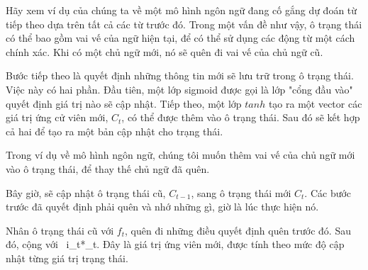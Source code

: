Hãy xem ví dụ của chúng ta về một mô hình ngôn ngữ đang cố gắng dự đoán từ tiếp theo dựa trên tất cả các từ trước đó.
Trong một vấn đề như vậy, ô trạng thái có thể bao gồm vai vế của ngữ hiện tại, để có thể sử dụng các động từ
một cách chính xác. Khi có một chủ ngữ mới, nó sẽ quên đi vai vế của chủ ngữ cũ.

\begin{figure}[!htb]
\end{figure}

Bước tiếp theo là quyết định những thông tin mới sẽ lưu trữ trong ô trạng thái. Việc này có hai phần. Đầu tiên,
một lớp sigmoid được gọi là lớp "cổng đầu vào" quyết định giá trị nào sẽ cập nhật. Tiếp theo, một lớp \(tanh\)
tạo ra một vector các giá trị ứng cử viên mới, \(C_t\), có thể được thêm vào ô trạng thái. Sau đó sẽ kết hợp  cả hai
để tạo ra một bản cập nhật cho trạng thái.

Trong ví dụ về mô hình ngôn ngữ, chúng tôi muốn thêm vai vế của chủ ngữ mới vào ô trạng thái, để thay thế chủ ngữ đã
quên.
\begin{figure}[!htb]
\end{figure}

Bây giờ, sẽ cập nhật ô trạng thái cũ, \(C_{t-1}\), sang ô trạng thái mới \(C_{t}\). Các bước trước đã quyết định phải
quên và nhớ những gì, giờ là lúc thực hiện nó.

Nhân ô trạng thái cũ với \(f_t\), quên đi những điều quyết định quên trước đó. Sau đó, cộng với \
i_t*_t\).
Đây là giá trị ứng viên mới, được tính theo mức độ cập nhật từng giá trị trạng thái.

